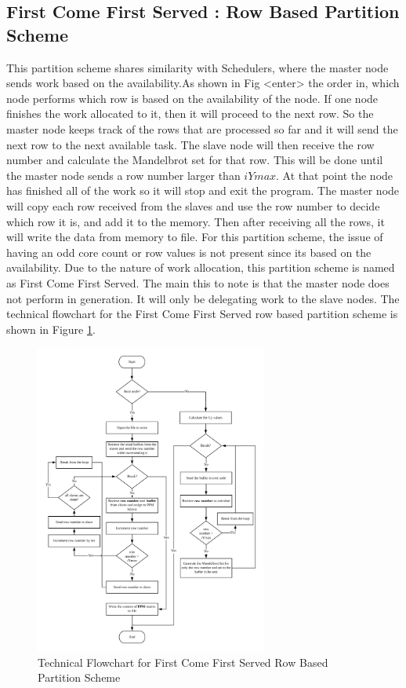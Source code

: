 \documentclass[conference]{IEEEtran}
\begin{document}
			\subsection{First Come First Served : Row Based Partition Scheme}\label{FCFS}
			This partition scheme shares similarity with Schedulers, where the master node sends work based on the availability.As shown in Fig  <enter> the order in, which node performs which row is based on the availability of the node. If one node finishes the work allocated to it, then it will proceed to the next row. So the master node keeps track of the rows that are processed so far and it will send the next row to the next available task. The slave node will then receive the row number and calculate the Mandelbrot set for that row. This will be done until the master node sends a row number larger than $iYmax$. At that point the node has finished all of the work so it will stop and exit the program. The master node will copy each row received from the slaves and use the row number to decide which row it is, and add it to the memory. Then after receiving all the rows, it will write the data from memory to file. For this partition scheme, the issue of having an odd core count or row values is not present since its based on the availability. 
			Due to the nature of work allocation, this partition scheme is named as First Come First Served. The main this to note is that the master node does not perform in generation. It will only be delegating work to the slave nodes. The technical flowchart for the First Come First Served row based partition scheme is shown in Figure \ref{FCFS_i}.
			
			\begin{figure}[h]
				\centering
				\includegraphics[width=3in]{FCFS}
				\caption{Technical Flowchart for First Come First Served Row Based Partition Scheme}
				\label{FCFS_i}
			\end{figure}
	
\end{document}
